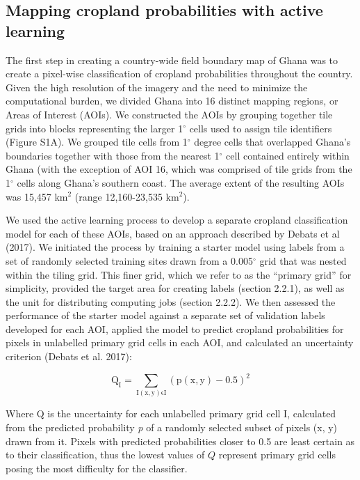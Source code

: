 \documentclass[11pt,a4paper]{article}
\begin{document}
\hypertarget{mapping-cropland-probabilities-with-active-learning}{%
\subsection{Mapping cropland probabilities with active
learning}\label{mapping-cropland-probabilities-with-active-learning}}

The first step in creating a country-wide field boundary map of Ghana
was to create a pixel-wise classification of cropland probabilities
throughout the country. Given the high resolution of the imagery and the
need to minimize the computational burden, we divided Ghana into 16
distinct mapping regions, or Areas of Interest (AOIs). We constructed
the AOIs by grouping together tile grids into blocks representing the
larger 1\(^\circ\) cells used to assign tile identifiers (Figure S1A).
We grouped tile cells from 1\(^\circ\) degree cells that overlapped
Ghana's boundaries together with those from the nearest 1\(^\circ\) cell
contained entirely within Ghana (with the exception of AOI 16, which was
comprised of tile grids from the 1\(^\circ\) cells along Ghana's
southern coast. The average extent of the resulting AOIs was 15,457
km\(^2\) (range 12,160-23,535 km\(^2\)).

We used the active learning process to develop a separate cropland
classification model for each of these AOIs, based on an approach
described by Debats et al (2017). We initiated the process by training a
starter model using labels from a set of randomly selected training
sites drawn from a 0.005\(^\circ\) grid that was nested within the
tiling grid. This finer grid, which we refer to as the ``primary grid''
for simplicity, provided the target area for creating labels (section
2.2.1), as well as the unit for distributing computing jobs (section
2.2.2). We then assessed the performance of the starter model against a
separate set of validation labels developed for each AOI, applied the
model to predict cropland probabilities for pixels in unlabelled primary
grid cells in each AOI, and calculated an uncertainty criterion (Debats
et al. 2017):

\begin{equation}
\mathrm{Q_I = \sum_{I(x, y) \epsilon I} (p(x, y) - 0.5)^2}
\end{equation}

Where Q is the uncertainty for each unlabelled primary grid cell I,
calculated from the predicted probability \emph{p} of a randomly
selected subset of pixels (x, y) drawn from it. Pixels with predicted
probabilities closer to 0.5 are least certain as to their
classification, thus the lowest values of \(Q\) represent primary grid
cells posing the most difficulty for the classifier.
\end{document}

